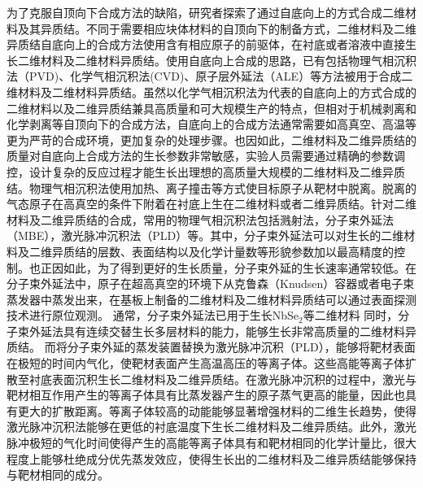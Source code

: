为了克服自顶向下合成方法的缺陷，研究者探索了通过自底向上的方式合成二维材料及其异质结。不同于需要相应块体材料的自顶向下的制备方式，二维材料及二维异质结自底向上的合成方法使用含有相应原子的前驱体，在衬底或者溶液中直接生长二维材料及二维材料异质结。使用自底向上合成的思路，已有包括物理气相沉积法（PVD)、化学气相沉积法(CVD)、原子层外延法（ALE）等方法被用于合成二维材料及二维材料异质结。虽然以化学气相沉积法为代表的自底向上的方式合成的二维材料以及二维异质结兼具高质量和可大规模生产的特点，但相对于机械剥离和化学剥离等自顶向下的合成方法，自底向上的合成方法通常需要如高真空、高温等更为严苛的合成环境，更加复杂的处理步骤。也因如此，二维材料及二维异质结的质量对自底向上合成方法的生长参数非常敏感，实验人员需要通过精确的参数调控，设计复杂的反应过程才能生长出理想的高质量大规模的二维材料及二维异质结。物理气相沉积法使用加热、离子撞击等方式使目标原子从靶材中脱离。脱离的气态原子在高真空的条件下附着在衬底上生在二维材料或者二维异质结。针对二维材料及二维异质结的合成，常用的物理气相沉积法包括溅射法，分子束外延法（MBE），激光脉冲沉积法（PLD）等。其中，分子束外延法可以对生长的二维材料及二维异质结的层数、表面结构以及化学计量数等形貌参数加以最高精度的控制。也正因如此，为了得到更好的生长质量，分子束外延的生长速率通常较低。在分子束外延法中，原子在超高真空的环境下从克鲁森（Knudsen）容器或者电子束蒸发器中蒸发出来，在基板上制备的二维材料及二维材料异质结可以通过表面探测技术进行原位观测。%
通常，分子束外延法已用于生长NbSe$_2$等二维材料%
同时，分子束外延法具有连续交替生长多层材料的能力，能够生长非常高质量的二维材料异质结。%
而将分子束外延的蒸发装置替换为激光脉冲沉积（PLD），能够将靶材表面在极短的时间内气化，使靶材表面产生高温高压的等离子体。这些高能等离子体扩散至衬底表面沉积生长二维材料及二维异质结。在激光脉冲沉积的过程中，激光与靶材相互作用产生的等离子体具有比蒸发器产生的原子蒸气更高的能量，因此也具有更大的扩散距离。等离子体较高的动能能够显著增强材料的二维生长趋势，使得激光脉冲沉积法能够在更低的衬底温度下生长二维材料及二维异质结。此外，激光脉冲极短的气化时间使得产生的高能等离子体具有和靶材相同的化学计量比，很大程度上能够杜绝成分优先蒸发效应，使得生长出的二维材料及二维异质结能够保持与靶材相同的成分。



